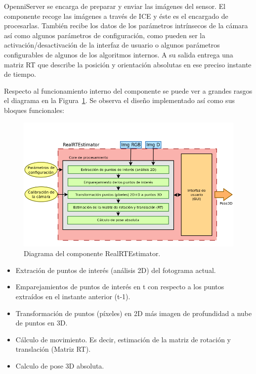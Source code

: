 OpenniServer se encarga de preparar y enviar las imágenes del sensor. El componente recoge las imágenes a través de ICE y éste es el encargado de procesarlas. También recibe los datos de los parámetros intrínsecos de la cámara así como algunos parámetros de configuración, como pueden ser la activación/desactivación de la interfaz de usuario o algunos parámetros configurables de algunos de los algoritmos internos. A su salida entrega una matriz RT que describe la posición y orientación absolutas en ese preciso instante de tiempo. 

Respecto al funcionamiento interno del componente se puede ver a grandes rasgos el diagrama en la Figura~\ref{fig:diagram2}. Se observa el diseño implementado así como sus bloques funcionales:

\begin{figure}[!ht]
\centering
\includegraphics[scale=0.36]{Figures/diagram2.png}
\decoRule
\caption[Diagram2]{Diagrama del componente RealRTEstimator.}
\label{fig:diagram2}
\end{figure}

\begin{itemize}
\item Extración de puntos de interés (análisis 2D) del fotograma actual.

\item Emparejamientos de puntos de interés en t con respecto a los puntos extraídos en el instante anterior (t-1).

\item Transformación de puntos (píxeles) en 2D más imagen de profundidad a nube de puntos en 3D.

\item Cálculo de movimiento. Es decir, estimación de la matriz de rotación y translación (Matriz RT).

\item Calculo de pose 3D absoluta.

\end{itemize}

